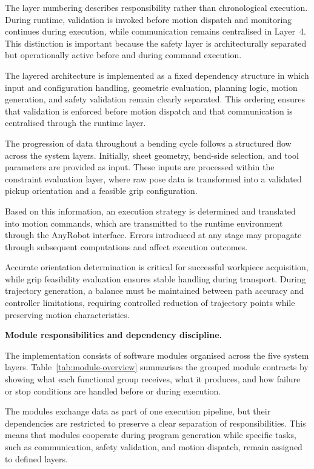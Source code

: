 The layer numbering describes responsibility rather than chronological execution. During runtime, validation is invoked before motion dispatch and monitoring continues during execution, while communication remains centralised in Layer~4. This distinction is important because the safety layer is architecturally separated but operationally active before and during command execution.

The layered architecture is implemented as a fixed dependency structure in which input and configuration handling, geometric evaluation, planning logic, motion generation, and safety validation remain clearly separated. This ordering ensures that validation is enforced before motion dispatch and that communication is centralised through the runtime layer.

The progression of data throughout a bending cycle follows a structured flow across the system layers. Initially, sheet geometry, bend-side selection, and tool parameters are provided as input. These inputs are processed within the constraint evaluation layer, where raw pose data is transformed into a validated pickup orientation and a feasible grip configuration.

Based on this information, an execution strategy is determined and translated into motion commands, which are transmitted to the runtime environment through the AnyRobot interface. Errors introduced at any stage may propagate through subsequent computations and affect execution outcomes.

Accurate orientation determination is critical for successful workpiece acquisition, while grip feasibility evaluation ensures stable handling during transport. During trajectory generation, a balance must be maintained between path accuracy and controller limitations, requiring controlled reduction of trajectory points while preserving motion characteristics.

\label{sec:module-overview}
\noindent\textbf{Module responsibilities and dependency discipline.}

The implementation consists of software modules organised across the five system layers. Table~\ref{tab:module-overview} summarises the grouped module contracts by showing what each functional group receives, what it produces, and how failure or stop conditions are handled before or during execution.

\clearpage

\clearpage

The modules exchange data as part of one execution pipeline, but their dependencies are restricted to preserve a clear separation of responsibilities. This means that modules cooperate during program generation while specific tasks, such as communication, safety validation, and motion dispatch, remain assigned to defined layers.


